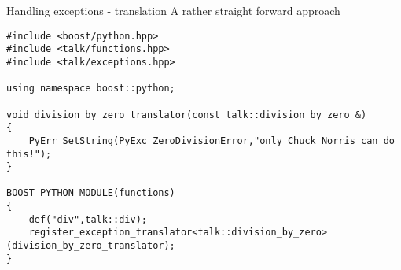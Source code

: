 \begin{frame}[fragile]{Handling exceptions - translation}
    A rather straight forward approach
    \vspace{0.04\textheight}
    \begin{verbatim}
#include <boost/python.hpp>
#include <talk/functions.hpp>
#include <talk/exceptions.hpp>

using namespace boost::python;

void division_by_zero_translator(const talk::division_by_zero &)
{
    PyErr_SetString(PyExc_ZeroDivisionError,"only Chuck Norris can do this!");
}

BOOST_PYTHON_MODULE(functions)
{
    def("div",talk::div);
    register_exception_translator<talk::division_by_zero>(division_by_zero_translator);
}
    \end{verbatim}
\end{frame}

